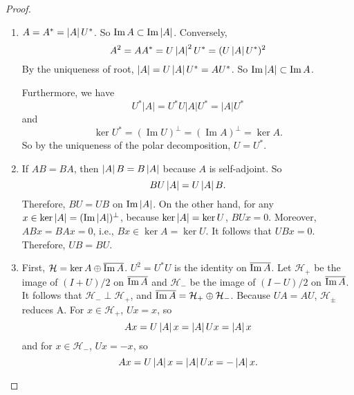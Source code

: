 \documentclass[a4paper,12pt]{article}
\begin{document}
\begin{proof}
    \begin{enumerate}[label=(\arabic{*})]
        \item $A = A^* = \left\lvert A\right\lvert U^*$. So $\operatorname{Im} A \subset \operatorname{Im} \left\lvert A\right\lvert$. Conversely,
        \begin{equation*}
            A^2 = AA^* = U \left\lvert A\right\lvert^2 U^* = (U\left\lvert A\right\lvert U^*)^2
        \end{equation*}
        By the uniqueness of root, $\left\lvert A\right\lvert = U\left\lvert A\right\lvert U^* = AU^*$. So $\operatorname{Im} \left\lvert A\right\lvert \subset \operatorname{Im} A$.

        Furthermore, we have
        \begin{equation*}
            U^*|A|=U^* U|A| U^*=|A| U^*
        \end{equation*}
        and
        \begin{equation*}
            \operatorname{ker} U^*=(\operatorname{Im} U)^{\perp}=(\operatorname{Im} A)^{\perp}=\operatorname{ker} A.
        \end{equation*}
        So by the uniqueness of the polar decomposition, $U = U^*$.

        \item If $AB = BA$, then $\left\lvert A\right\lvert B = B\left\lvert A\right\lvert$ because $A$ is self-adjoint. So
        \begin{equation*}
            BU\left\lvert A\right\lvert = U \left\lvert A\right\lvert B.
        \end{equation*}
        Therefore, $BU = UB$ on $\operatorname{Im} \left\lvert A\right\lvert$. On the other hand, for any $x \in \ker \left\lvert A\right\lvert = (\operatorname{Im} \left\lvert A\right\lvert)^\perp$, because $\ker \left\lvert A\right\lvert = \ker U$, $BUx = 0$. Moreover, $ABx = BAx = 0$, i.e., $Bx \in \ker A = \ker U$. It follows that $UBx = 0$. Therefore, $UB = BU$.

        \item First, $\mathcal{H} = \ker A \oplus \overline{\operatorname{Im} A}$. $U^2 = U^*U$ is the identity on $\overline{\operatorname{Im} A}$. Let $\mathcal{H}_+$ be the image of $(I + U) / 2$ on $\overline{\operatorname{Im} A}$ and $\mathcal{H}_-$ be the image of $(I - U) / 2$ on $\overline{\operatorname{Im} A}$. It follows that $\mathcal{H}_- \perp \mathcal{H}_+$, and $\overline{\operatorname{Im} A} = \mathcal{H}_+ \oplus \mathcal{H}_-$. Because $UA = AU$, $\mathcal{H}_\pm$ reduces A. For $x \in \mathcal{H}_+$, $Ux = x$, so
        \begin{equation*}
            Ax = U\left\lvert A\right\lvert x = \left\lvert A\right\lvert Ux = \left\lvert A\right\lvert x
        \end{equation*}
        and for $x \in \mathcal{H}_-$, $Ux = -x$, so
        \begin{equation*}
            Ax = U\left\lvert A\right\lvert x = \left\lvert A\right\lvert Ux = -\left\lvert A\right\lvert x.
        \end{equation*}


\end{enumerate}
\end{proof}
\end{document}
